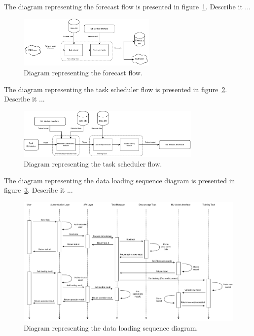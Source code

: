 The diagram representing the forecast flow is presented in figure~\ref{fig:forecastflow}.
Describe it ...

\begin{figure}[H]
\centering 
\includegraphics[width=0.6\textwidth]{images/architecture_forecast_flow}
\caption{Diagram representing the forecast flow.}
\label{fig:forecastflow}
\end{figure}

The diagram representing the task scheduler flow is presented in figure~\ref{fig:schedulerflow}.
Describe it ...

\begin{figure}[H]
\centering 
\includegraphics[width=0.8\textwidth]{images/architecture_scheduler_flow}
\caption{Diagram representing the task scheduler flow.}
\label{fig:schedulerflow}
\end{figure}

The diagram representing the data loading sequence diagram is presented in figure~\ref{fig:loadingsequence}.
Describe it ...

\begin{figure}[H]
\centering 
\includegraphics[width=1\textwidth]{images/architecture_data_loading_sequence}
\caption{Diagram representing the data loading sequence diagram.}
\label{fig:loadingsequence}
\end{figure}

